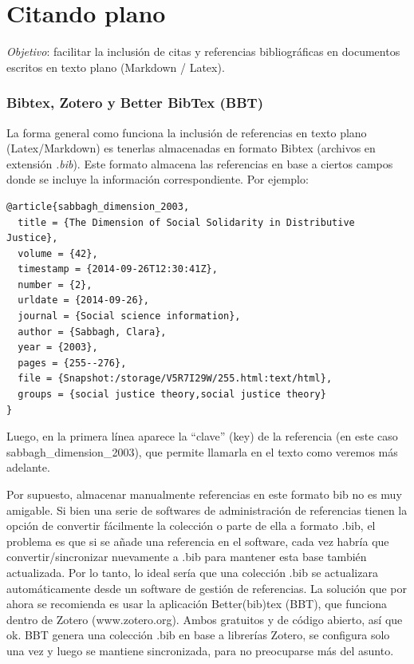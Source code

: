\documentclass[
  11pt,
]{book}
\begin{document}
\hypertarget{citando-plano}{%
\section{Citando plano}\label{citando-plano}}

\emph{Objetivo}: facilitar la inclusión de citas y referencias bibliográficas en documentos escritos en texto plano (Markdown / Latex).

\hypertarget{bibtex-zotero-y-better-bibtex-bbt}{%
\subsubsection{Bibtex, Zotero y Better BibTex (BBT)}\label{bibtex-zotero-y-better-bibtex-bbt}}

La forma general como funciona la inclusión de referencias en texto plano (Latex/Markdown) es tenerlas almacenadas en formato Bibtex (archivos en extensión \emph{.bib}). Este formato almacena las referencias en base a ciertos campos donde se incluye la información correspondiente. Por ejemplo:

\begin{verbatim}
@article{sabbagh_dimension_2003,
  title = {The Dimension of Social Solidarity in Distributive Justice},
  volume = {42},
  timestamp = {2014-09-26T12:30:41Z},
  number = {2},
  urldate = {2014-09-26},
  journal = {Social science information},
  author = {Sabbagh, Clara},
  year = {2003},
  pages = {255--276},
  file = {Snapshot:/storage/V5R7I29W/255.html:text/html},
  groups = {social justice theory,social justice theory}
}
\end{verbatim}

Luego, en la primera línea aparece la ``clave'' (key) de la referencia (en este caso sabbagh\_dimension\_2003), que permite llamarla en el texto como veremos más adelante.

Por supuesto, almacenar manualmente referencias en este formato bib no es muy amigable. Si bien una serie de softwares de administración de referencias tienen la opción de convertir fácilmente la colección o parte de ella a formato .bib, el problema es que si se añade una referencia en el software, cada vez habría que convertir/sincronizar nuevamente a .bib para mantener esta base también actualizada. Por lo tanto, lo ideal sería que una colección .bib se actualizara automáticamente desde un software de gestión de referencias. La solución que por ahora se recomienda es usar la aplicación Better(bib)tex (BBT), que funciona dentro de Zotero (www.zotero.org). Ambos gratuitos y de código abierto, así que ok. BBT genera una colección .bib en base a librerías Zotero, se configura solo una vez y luego se mantiene sincronizada, para no preocuparse más del asunto.
\end{document}
